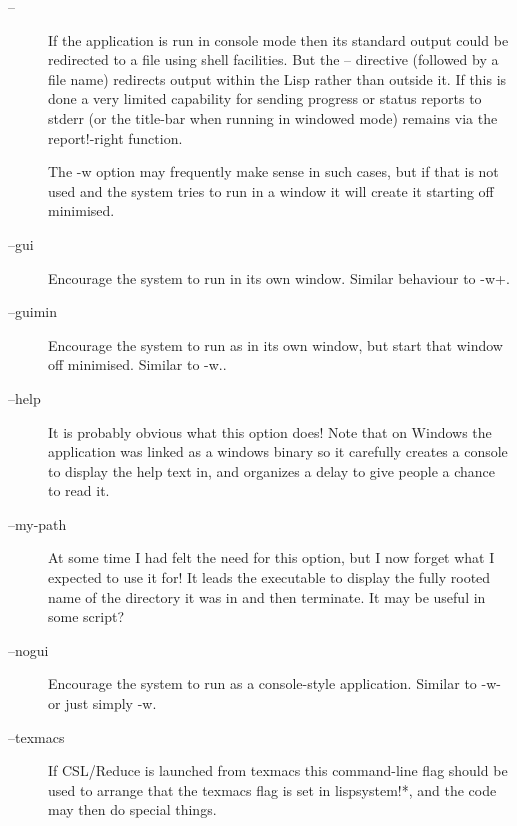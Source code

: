 \documentclass[a4paper,11pt]{article}
\begin{document}
\begin{description} 

\item [{\ttfamily --}] \index{{\ttfamily --}}
If the application is run in console mode then its standard output could
be redirected to a file using shell facilities. But the {\ttfamily --}
directive (followed by a file name) redirects output within the Lisp rather
than outside it. If this is done a very limited capability for sending
progress or status reports to stderr (or the title-bar when running in windowed
mode) remains via the {\ttfamily report!-right} function.
  
The {\ttfamily -w} option may frequently make sense in such cases, but if that
is not used and the system tries to run in a window it will create it
starting off minimised.

\item [{\ttfamily --gui}] 
Encourage the system to run in its own window. Similar behaviour
to {\ttfamily -w+}.

\item [{\ttfamily --guimin}] 
Encourage the system to run as in its own window, but
start that window off minimised. Similar
to {\ttfamily -w.}.

\item [{\ttfamily --help}] 
It is probably obvious what this option does! Note that on Windows the
application was linked as a windows binary so it carefully creates a
console to display the help text in, and organizes a delay to give
people a chance to read it.

\item [{\ttfamily --my-path}] 
At some time I had felt the need for this option, but I now forget what I
expected to use it for! It leads the executable to display the fully
rooted name of the directory it was in and then terminate. It may be useful
in some script?

\item [{\ttfamily --nogui}] 
Encourage the system to run as a console-style application. Similar
to {\ttfamily -w-} or just simply {\ttfamily -w}.

\item [{\ttfamily --texmacs}] 
If CSL/Reduce is launched from texmacs this command-line flag should be
used to arrange that the {\ttfamily texmacs} flag is set in
{\ttfamily lispsystem!*}, and the code may then do special things.


\end{description}
\end{document}
